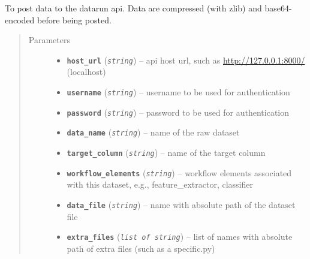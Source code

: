 \documentclass[letterpaper,10pt,english]{sphinxmanual}
\begin{document}
\begin{fulllineitems}
\label{modules/views:test_files.post_api.post_data}
To post data to the datarun api.    Data are compressed (with zlib) and base64-encoded before being posted.
\begin{quote}\begin{description}
\item[{Parameters}] \leavevmode\begin{itemize}
\item {} 
\textbf{\texttt{host\_url}} (\emph{\texttt{string}}) -- api host url, such as \url{http://127.0.0.1:8000/} (localhost)

\item {} 
\textbf{\texttt{username}} (\emph{\texttt{string}}) -- username to be used for authentication

\item {} 
\textbf{\texttt{password}} (\emph{\texttt{string}}) -- password to be used for authentication

\item {} 
\textbf{\texttt{data\_name}} (\emph{\texttt{string}}) -- name of the raw dataset

\item {} 
\textbf{\texttt{target\_column}} (\emph{\texttt{string}}) -- name of the target column

\item {} 
\textbf{\texttt{workflow\_elements}} (\emph{\texttt{string}}) -- workflow elements associated with this dataset,    e.g., feature\_extractor, classifier

\item {} 
\textbf{\texttt{data\_file}} (\emph{\texttt{string}}) -- name with absolute path of the dataset file

\item {} 
\textbf{\texttt{extra\_files}} (\emph{\texttt{list of string}}) -- list of names with absolute path of extra files        (such as a specific.py)

\end{itemize}

\end{description}\end{quote}

\end{fulllineitems}
\end{document}

